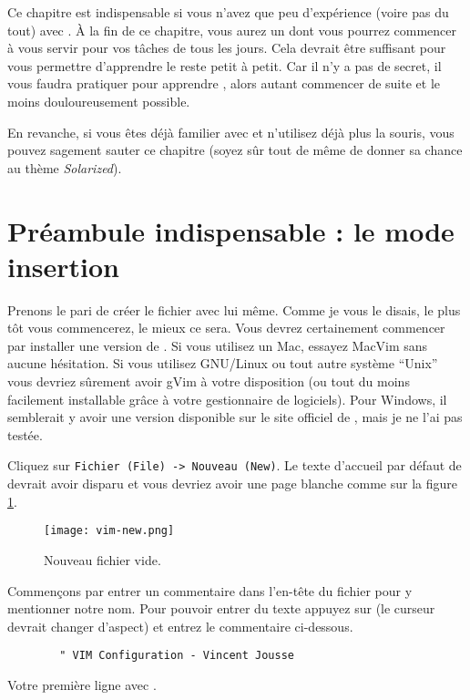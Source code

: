 Ce chapitre est indispensable si vous n'avez que peu d'expérience (voire pas du tout) avec \vim. À la fin de ce chapitre, vous aurez un \vim dont vous pourrez commencer à vous servir pour vos tâches de tous les jours. Cela devrait être suffisant pour vous permettre d'apprendre le reste petit à petit. Car il n'y a pas de secret, il vous faudra pratiquer pour apprendre \vim, alors autant commencer de suite et le moins douloureusement possible.

En revanche, si vous êtes déjà familier avec \vim et n'utilisez déjà plus la souris, vous pouvez sagement sauter ce chapitre (soyez sûr tout de même de donner sa chance au thème \emph{Solarized}).

\section{Préambule indispensable : le mode insertion}\label{sec:modeinsertion}

Prenons le pari de créer le fichier \vimrc avec \vim lui même. Comme je vous le disais, le plus tôt vous commencerez, le mieux ce sera.
Vous devrez certainement commencer par installer une version de \vim. Si vous utilisez un Mac, essayez MacVim  sans aucune hésitation. Si vous utilisez GNU/Linux ou tout autre système ``Unix'' vous devriez sûrement avoir gVim à votre disposition (ou tout du moins facilement installable grâce à votre gestionnaire de logiciels). Pour Windows, il semblerait y avoir une version disponible sur le site officiel de \vim{}, mais je ne l'ai pas testée.

Cliquez sur \Verb|Fichier (File) -> Nouveau (New)|. Le texte d'accueil par défaut de \vim devrait avoir disparu et vous devriez avoir une page blanche comme sur la figure \ref{fig:vim-new}. 

\begin{figure}%
  \texttt{[image: vim-new.png]}
  \caption{Nouveau fichier vide.}
  \label{fig:vim-new}
\end{figure}

Commençons par entrer un commentaire dans l'en-tête du fichier pour y mentionner notre nom. Pour pouvoir entrer du texte appuyez sur \tti (le curseur devrait changer d'aspect) et entrez le commentaire ci-dessous.
\begin{listing}[H]

    \begin{verbatim}
        " VIM Configuration - Vincent Jousse
    \end{verbatim}
    \caption{Votre première ligne avec \vim.}
    \label{code:first-comment}
\end{listing}


